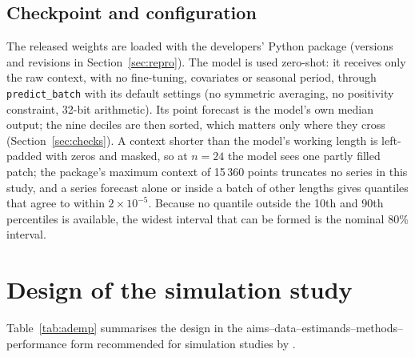 \documentclass[ASNA]{USG}
\newcommand{\proglang}[1]{\textsf{#1}}
\newcommand{\code}[1]{\texttt{#1}}
\providecommand{\sectionref}[1]{Section~\ref{#1}}
\providecommand{\tableref}[1]{Table~\ref{#1}}
\begin{document}
\subsection{Checkpoint and configuration}
\label{sec:tfm-config}

The released weights are loaded with the developers' \proglang{Python} package (versions and revisions in
\sectionref{sec:repro}). The model is used zero-shot: it receives only the raw context, with no fine-tuning,
covariates or seasonal period, through \code{predict\_batch} with its default settings (no symmetric
averaging, no positivity constraint, 32-bit arithmetic). Its point forecast is the model's own median
output; the nine deciles are then sorted, which matters only where they cross (\sectionref{sec:checks}). A
context shorter than the model's working length is left-padded with zeros and masked, so at $n = 24$ the
model sees one partly filled patch; the package's maximum context of 15\,360 points truncates no series in
this study, and a series forecast alone or inside a batch of other lengths gives quantiles that agree to
within $2 \times 10^{-5}$. Because no quantile outside the 10th and 90th percentiles is available, the widest
interval that can be formed is the nominal 80\% interval.

\section{Design of the simulation study}
\label{sec:design}

\tableref{tab:ademp} summarises the design in the aims--data--estimands--methods--performance form
recommended for simulation studies by \citet{morris2019simulation}.
\end{document}
